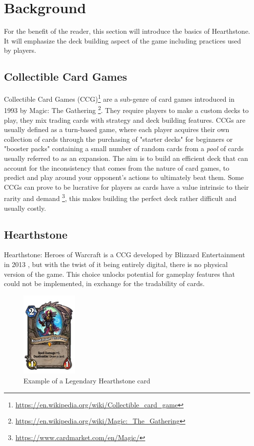 \documentclass{report} %
\begin{document}
\section{Background}
	For the benefit of the reader, this section will introduce the basics of Hearthstone. It will emphasize the deck building aspect of the game including practices used by players.  
\subsection{Collectible Card Games}
	Collectible Card Games (CCG)\footnote{\url{https://en.wikipedia.org/wiki/Collectible_card_game}} are a sub-genre of card games introduced in 1993 by Magic: The Gathering \footnote{\url{https://en.wikipedia.org/wiki/Magic:_The_Gathering}}. They require players to make a custom decks to play, they mix trading cards with strategy and deck building features. CCGs are usually defined as a turn-based game, where each player acquires their own collection of cards through the purchasing of "starter decks" for beginners or "booster packs" containing a small number of random cards from a {\it{pool}} of cards usually referred to as an expansion. The aim is to build an efficient deck that can account for the inconsistency that comes from the nature of card games, to predict and play around your opponent's actions to ultimately beat them. Some CCGs can prove to be lucrative for players as cards have a value intrinsic to their rarity and demand \footnote{\url{https://www.cardmarket.com/en/Magic/}}, this makes building the perfect deck rather difficult and usually costly.
\subsection{Hearthstone}
	Hearthstone: Heroes of Warcraft is a CCG developed by Blizzard Entertainment in 2013 \cite{HS}, but with the twist of it being entirely digital, there is no physical version of the game. This choice unlocks potential for gameplay features that could not be implemented, in exchange for the tradability of cards. \\ 
\begin{figure}[h]
\centering
\includegraphics[width=0.25\textwidth]{thalnos}
\caption{Example of a Legendary Hearthstone card\protect\footnotemark
\label{card}
}
\end{figure}
\end{document}
